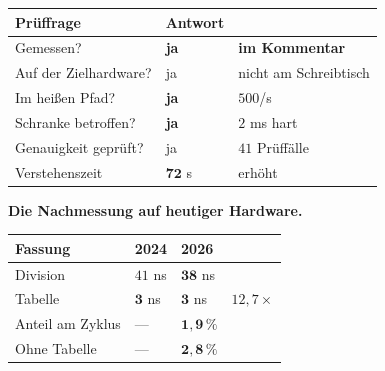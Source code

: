 \begin{merksatz}
\begin{center}
{\small
\renewcommand{\arraystretch}{1.45}
\begin{tabular}{@{}P{3.0cm}P{2.2cm}P{2.6cm}@{}}
\toprule
\textbf{Prüffrage} & \textbf{Antwort} & \\
\midrule
Gemessen? & \textcolor{gruen}{\textbf{ja}} & \textbf{im Kommentar}\\
Auf der Zielhardware? & \textcolor{gruen}{ja} & \textcolor{gruen}{nicht am Schreibtisch}\\
Im heißen Pfad? & \textcolor{gruen}{\textbf{ja}} & $500$/s\\
Schranke betroffen? & \textcolor{gruen}{\textbf{ja}} & \textcolor{gruen}{$2$ ms hart}\\
Genauigkeit geprüft? & \textcolor{gruen}{ja} & \textcolor{gruen}{$41$ Prüffälle}\\
Verstehenszeit & $\mathbf{72}$ s & \textcolor{mittel}{erhöht}\\
\bottomrule
\end{tabular}}
\end{center}

\begin{center}
\begin{minipage}{0.88\textwidth}
\end{minipage}
\end{center}

\textbf{Die Nachmessung auf heutiger Hardware.}

\begin{center}
\renewcommand{\arraystretch}{1.45}
\begin{tabular}{@{}P{2.8cm}P{2.0cm}P{2.2cm}P{2.0cm}@{}}
\toprule
\textbf{Fassung} & \textbf{2024} & \textbf{2026} & \\
\midrule
Division & $41$ ns & $\mathbf{38}$ ns & \\
Tabelle & $\mathbf{3}$ ns & $\mathbf{3}$ ns & $12{,}7\times$\\
Anteil am Zyklus & --- & $\mathbf{1{,}9\,\%}$ & \\
Ohne Tabelle & --- & \textcolor{mittel}{$\mathbf{2{,}8\,\%}$} & \\
\bottomrule
\end{tabular}
\end{center}

\begin{center}
\end{center}
\end{merksatz}


